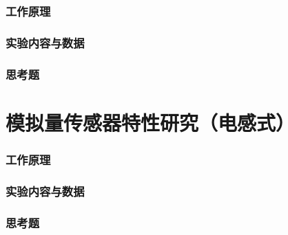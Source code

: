 \section{工作原理}
\section{实验内容与数据}
\section{思考题}
\part{模拟量传感器特性研究（电感式）}
\section{工作原理}
\section{实验内容与数据}
\section{思考题}


